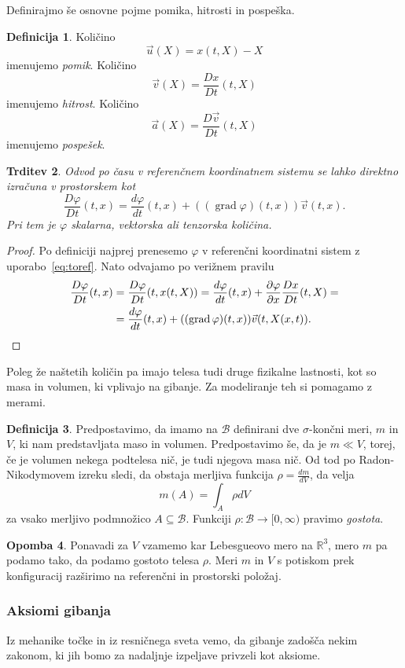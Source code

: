 \documentclass[12pt,a4paper,twoside]{article}
\theoremstyle{definition} %
\newtheorem{definicija}{Definicija}[section]
\newtheorem{opomba}[definicija]{Opomba}
\theoremstyle{plain} %
\newtheorem{trditev}[definicija]{Trditev}
\numberwithin{equation}{section}
\newcommand{\R}{\mathbb R}
\newcommand{\B}{\mathcal{B}}
\newcommand{\grad}{\operatorname{grad}}
\renewcommand{\phi}{\varphi}
\newcommand{\dpar}[2]{\ensuremath{\frac{\partial #1}{\partial #2}}}
\newcommand{\dd}[2]{\ensuremath{\frac{d #1}{d #2}}}
\newcommand{\ddt}[1]{\dd{#1}{t}}
\newcommand{\DD}[2]{\ensuremath{\frac{D #1}{D #2}}}
\newcommand{\DDt}[1]{\DD{#1}{t}}
\newcommand{\vv}{\vec{v}}
\newcommand{\vu}{\vec{u}}
\newcommand{\va}{\vec{a}}
\newcommand{\vX}{X}
\newcommand{\vx}{x}
\begin{document}
Definirajmo še osnovne pojme pomika, hitrosti in pospeška.
\begin{definicija}
  Količino \[ \vu(\vX) = \vx(t, \vX) - \vX \] imenujemo \emph{pomik}.
  Količino \[ \vv(\vX) = \DDt{\vx}(t, \vX) \] imenujemo \emph{hitrost}.
  Količino \[ \va(\vX) = \DDt{\vv}(t, \vX) \] imenujemo \emph{pospešek}.
\end{definicija}
\begin{trditev}
  Odvod po času v referenčnem koordinatnem sistemu se lahko direktno izračuna v
  prostorskem kot
  \[
  \DDt{\phi}(t, \vx) = \ddt{\phi}(t, \vx) + ((\grad \phi)(t, \vx)) \vv(t, \vx).
  \]
  Pri tem je $\phi$ skalarna, vektorska ali tenzorska količina.
\end{trditev}
\begin{proof}
  Po definiciji najprej prenesemo $\phi$ v referenčni koordinatni sistem z
  uporabo~\ref{eq:toref}. Nato odvajamo po verižnem pravilu
  \begin{align*}
    \DDt \phi(t, \vx) &= \DDt \phi(t, \vx(t, \vX)) =
    \ddt \phi(t, \vx) + \dpar{\phi}{\vx} \DDt{\vx} (t, \vX) = \\
    &= \ddt \phi(t, \vx) + ((\grad \phi)(t, \vx)) \vv(t, \vX(\vx, t)). \qedhere
  \end{align*}
\end{proof}

Poleg že naštetih količin pa imajo telesa tudi druge fizikalne lastnosti, kot so
masa in volumen, ki vplivajo na gibanje. Za modeliranje teh si pomagamo z
merami.

\begin{definicija}
  Predpostavimo, da imamo na $\B$ definirani dve $\sigma$-končni meri, $m$ in
  $V$, ki nam predstavljata maso in volumen. Predpostavimo še, da je $m \ll V$,
  torej, če je volumen nekega podtelesa nič, je tudi njegova masa nič. Od tod po
  Radon-Nikodymovem izreku sledi, da obstaja merljiva funkcija $\rho =
  \dd{m}{V}$, da velja
  \[
    m(A) = \int_{A} \rho dV
  \]
  za vsako merljivo podmnožico $A \subseteq \B$.
  Funkciji $\rho\colon\B\to[0, \infty)$ pravimo \emph{gostota}.
\end{definicija}
\begin{opomba}
  Ponavadi za $V$ vzamemo kar Lebesgueovo mero na $\R^3$, mero $m$ pa podamo tako, da
  podamo gostoto telesa $\rho$. Meri $m$ in $V$ s potiskom prek konfiguracij
  razširimo na referenčni in prostorski položaj.
\end{opomba}

\subsubsection{Aksiomi gibanja}
Iz mehanike točke in iz resničnega sveta vemo, da gibanje zadošča nekim
zakonom, ki jih bomo za nadaljnje izpeljave privzeli kot aksiome.
\end{document}
